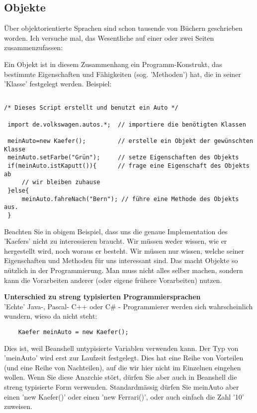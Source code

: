 \documentclass[a4paper]{scrartcl}
\begin{document}
\subsection{Objekte}
Über objektorientierte Sprachen sind schon tausende von Büchern geschrieben worden. Ich versuche mal, das Wesentliche auf einer oder zwei Seiten zusammenzufassen:

Ein Objekt ist in diesem Zusammenhang ein Programm-Konstrukt, das bestimmte Eigenschaften und Fähigkeiten (sog. 'Methoden') hat, die in seiner 'Klasse' festgelegt werden. Beispiel:

\begin{small}
\begin{verbatim}

/* Dieses Script erstellt und benutzt ein Auto */

 import de.volkswagen.autos.*;  // importiere die benötigten Klassen

 meinAuto=new Kaefer();         // erstelle ein Objekt der gewünschten Klasse
 meinAuto.setFarbe("Grün");     // setze Eigenschaften des Objekts
 if(meinAuto.istKaputt()){      // frage eine Eigenschaft des Objekts ab
     // wir bleiben zuhause
 }else{
     meinAuto.fahreNach("Bern"); // führe eine Methode des Objekts aus.
 }

\end{verbatim}
\end{small}

Beachten Sie in obigem Beispiel, dass uns die genaue Implementation des 'Kaefers' nicht zu interessieren braucht. Wir müssen weder wissen, wie er hergestellt wird, noch woraus er besteht. Wir müssen nur wissen, welche seiner Eigenschaften und Methoden für uns interessant sind.
Das macht Objekte so nützlich in der Programmierung. Man muss nicht alles selber machen, sondern
kann die Vorarbeiten anderer (oder eigene frühere Vorarbeiten) nutzen.

\medskip

\hrulefill

\textbf{Unterschied zu streng typisierten Programmiersprachen}\\
'Echte' Java-, Pascal- C++ oder C\# - Programmierer werden sich wahrscheinlich wundern, wieso da nicht steht:
\begin{small}
\begin{verbatim}
    Kaefer meinAuto = new Kaefer();
\end{verbatim}
\end{small}

Dies ist, weil Beanshell untypisierte Variablen verwenden kann. Der Typ von 'meinAuto' wird erst zur Laufzeit festgelegt. Dies hat eine Reihe von Vorteilen (und eine Reihe von Nachteilen), auf die wir hier nicht im Einzelnen eingehen wollen. Wenn Sie diese Anarchie stört, dürfen Sie aber auch in Beanshell die streng typisierte Form verwenden. Standardmässig dürfen Sie meinAuto aber einen 'new Kaefer()' oder einen 'new Ferrari()', oder auch einfach die Zahl '10' zuweisen.
\end{document}
